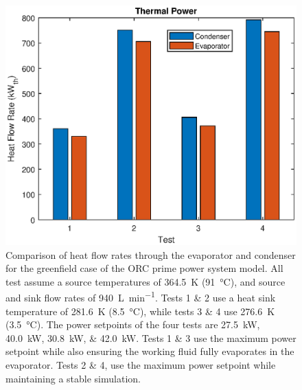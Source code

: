 \begin{figure}[h]
	\centering

	\includegraphics[width=\textwidth]{figures/gfHeat}

	\caption{Comparison of heat flow rates through the evaporator and condenser for the greenfield case of the ORC prime power system model. All test assume a source temperatures of \SI{364.5}{\kelvin} (\SI{91}{\degreeCelsius}), and source and sink flow rates of \SI{940}{\liter\per\minute}. Tests 1 \& 2 use a heat sink temperature of \SI{281.6}{\kelvin} (\SI{8.5}{\degreeCelsius}), while tests 3 \& 4 use \SI{276.6}{\kelvin} (\SI{3.5}{\degreeCelsius}). The power setpoints of the four tests are \SIlist{27.5;40.0;30.8;42.0}{\kilo\watt}. Tests 1 \& 3 use the maximum power setpoint while also ensuring the working fluid fully evaporates in the evaporator. Tests 2 \& 4, use the maximum power setpoint while maintaining a stable simulation. }
	\label{fig:gfHeat}
\end{figure}